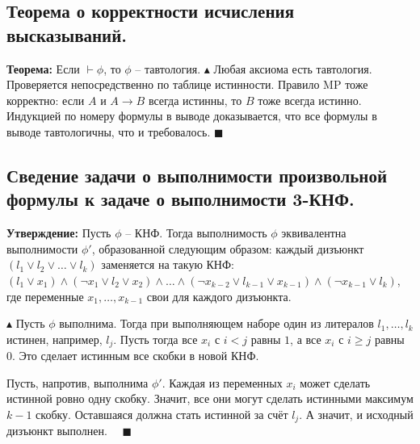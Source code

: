 \subsection{Теорема о корректности исчисления высказываний.}
\textbf{Теорема:} Если $\vdash \phi$, то $\phi$ -- тавтология.
\newline $\blacktriangle$ Любая аксиома есть тавтология. Проверяется непосредственно по таблице истинности. Правило MP тоже корректно: если $A$ и $A \to B$ всегда истинны, то $B$ тоже всегда истинно. Индукцией по номеру формулы в выводе доказывается, что все формулы в выводе тавтологичны, что и требовалось. $ \blacksquare$

\subsection{Сведение задачи о выполнимости произвольной формулы к задаче о выполнимости 3-КНФ.}
\textbf{Утверждение:} Пусть $\phi$ -- КНФ. Тогда выполнимость $\phi$ эквивалентна выполнимости $\phi'$, образованной следующим образом: каждый дизъюнкт $(l_1 \lor l_2 \lor \ldots \lor l_k)$ заменяется на такую КНФ: $(l_1 \lor x_1) \land (\neg x_1 \lor l_2 \lor x_2) \land\ldots\land (\neg x_{k-2} \lor l_{k-1} \lor x_{k-1}) \land (\neg x_{k-1} \lor l_k)$, где переменные $x_1, \ldots, x_{k-1}$ свои для каждого дизъюнкта.

$\blacktriangle$ Пусть $\phi$ выполнима. Тогда при выполняющем наборе один из литералов $l_1, \ldots, l_k$ истинен, например, $l_j$. Пусть тогда все $x_i$ с $i < j$ равны $1$, а все $x_i$ с $i \geqslant j$ равны $0$. Это сделает истинным все скобки в новой КНФ.

Пусть, напротив, выполнима $\phi'$. Каждая из переменных $x_i$ может сделать истинной ровно одну скобку. Значит, все они могут сделать истинными максимум $k - 1$ скобку. Оставшаяся должна стать истинной за счёт $l_j$. А значит, и исходный дизъюнкт выполнен. $\quad \blacksquare$


